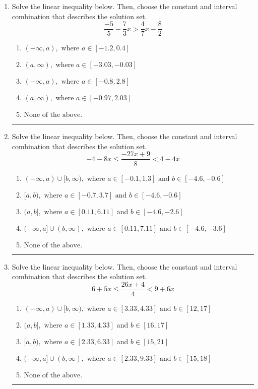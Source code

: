 \documentclass[14pt]{extbook}
\newcommand{\litem}[1]{\item#1\hspace*{-1cm}\rule{\textwidth}{0.4pt}}
\begin{document}
\begin{enumerate}
\litem{
Solve the linear inequality below. Then, choose the constant and interval combination that describes the solution set.\[ \frac{-5}{5} - \frac{7}{3} x > \frac{4}{7} x - \frac{8}{2} \]\begin{enumerate}[label=\Alph*.]
\item \( (-\infty, a), \text{ where } a \in [-1.2, 0.4] \)
\item \( (a, \infty), \text{ where } a \in [-3.03, -0.03] \)
\item \( (-\infty, a), \text{ where } a \in [-0.8, 2.8] \)
\item \( (a, \infty), \text{ where } a \in [-0.97, 2.03] \)
\item \( \text{None of the above}. \)

\end{enumerate} }
\litem{
Solve the linear inequality below. Then, choose the constant and interval combination that describes the solution set.\[ -4 - 8 x \leq \frac{-27 x + 9}{8} < 4 - 4 x \]\begin{enumerate}[label=\Alph*.]
\item \( (-\infty, a) \cup [b, \infty), \text{ where } a \in [-0.1, 1.3] \text{ and } b \in [-4.6, -0.6] \)
\item \( [a, b), \text{ where } a \in [-0.7, 3.7] \text{ and } b \in [-4.6, -0.6] \)
\item \( (a, b], \text{ where } a \in [0.11, 6.11] \text{ and } b \in [-4.6, -2.6] \)
\item \( (-\infty, a] \cup (b, \infty), \text{ where } a \in [0.11, 7.11] \text{ and } b \in [-4.6, -3.6] \)
\item \( \text{None of the above.} \)

\end{enumerate} }
\litem{
Solve the linear inequality below. Then, choose the constant and interval combination that describes the solution set.\[ 6 + 5 x \leq \frac{26 x + 4}{4} < 9 + 6 x \]\begin{enumerate}[label=\Alph*.]
\item \( (-\infty, a) \cup [b, \infty), \text{ where } a \in [3.33, 4.33] \text{ and } b \in [12, 17] \)
\item \( (a, b], \text{ where } a \in [1.33, 4.33] \text{ and } b \in [16, 17] \)
\item \( [a, b), \text{ where } a \in [2.33, 6.33] \text{ and } b \in [15, 21] \)
\item \( (-\infty, a] \cup (b, \infty), \text{ where } a \in [2.33, 9.33] \text{ and } b \in [15, 18] \)
\item \( \text{None of the above.} \)


\end{enumerate}}
\end{enumerate}
\end{document}
